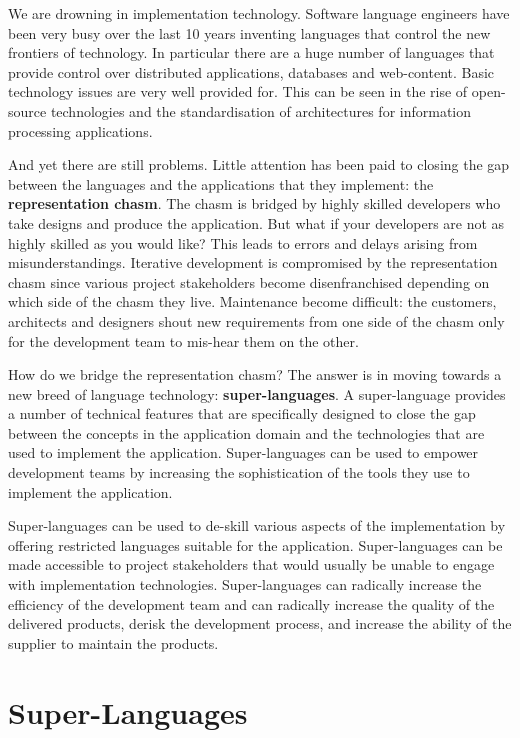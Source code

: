 We are drowning in implementation technology. Software language engineers
have been very busy over the last 10 years inventing languages that
control the new frontiers of technology. In particular there are a
huge number of languages that provide control over distributed applications,
databases and web-content. Basic technology issues are very well provided
for. This can be seen in the rise of open-source technologies and
the standardisation of architectures for information processing applications. 

And yet there are still problems. Little attention has been paid to
closing the gap between the languages and the applications that they
implement: the \textbf{representation chasm}. The chasm is bridged
by highly skilled developers who take designs and produce the application.
But what if your developers are not as highly skilled as you would
like? This leads to errors and delays arising from misunderstandings.
Iterative development is compromised by the representation chasm since
various project stakeholders become disenfranchised depending on which
side of the chasm they live. Maintenance become difficult: the customers,
architects and designers shout new requirements from one side of the
chasm only for the development team to mis-hear them on the other.

How do we bridge the representation chasm? The answer is in moving
towards a new breed of language technology: \textbf{super-languages}.
A super-language provides a number of technical features that are
specifically designed to close the gap between the concepts in the
application domain and the technologies that are used to implement
the application. Super-languages can be used to empower development
teams by increasing the sophistication of the tools they use to implement
the application. 

Super-languages can be used to de-skill various aspects of the implementation
by offering restricted languages suitable for the application. Super-languages
can be made accessible to project stakeholders that would usually
be unable to engage with implementation technologies. Super-languages
can radically increase the efficiency of the development team and
can radically increase the quality of the delivered products, derisk
the development process, and increase the ability of the supplier
to maintain the products.


\section{Super-Languages}

